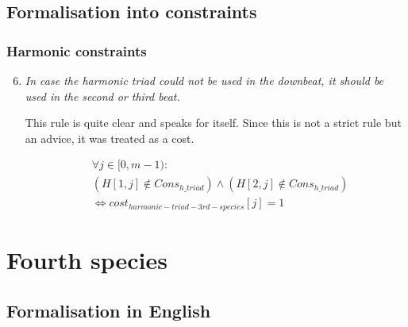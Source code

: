 \subsection{Formalisation into constraints}
\subsubsection{Harmonic constraints}
\begin{enumerate}[wide, label=\bfseries 3.H\arabic*]
\setcounter{enumi}{5}
    \item \textit{In case the harmonic triad could not be used in the downbeat, it should be used in the second or third beat.} \label{constraint:coherent}    

    This rule is quite clear and speaks for itself. Since this is not a strict rule but an advice, it was treated as a cost.

    \begin{equation} \begin{aligned}
            &\forall j \in [0, m-1) \colon \\
            &(H[1, j] \notin Cons_{h\_triad}) \land  (H[2, j] \notin Cons_{h\_triad})\\
            &\iff cost_{harmonic-triad-3rd-species}[j] = 1       
    \end{aligned} \end{equation}
\end{enumerate}




\section{Fourth species}
\subsection{Formalisation in English}\label{formalisation-en-4th}
